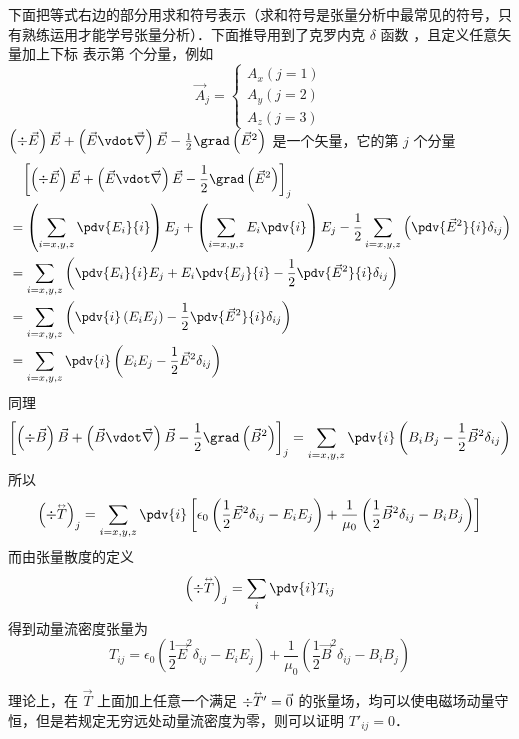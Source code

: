 下面把等式右边的部分用求和符号表示（求和符号是张量分析中最常见的符号，只有熟练运用才能学号张量分析）．下面推导用到了克罗内克 $\delta$ 函数 %
，且定义任意矢量加上下标 表示第 个分量，例如
\begin{equation}
{\vec A_j} = \left\{ \begin{array}{l}
{A_x} \left( {j = 1} \right)\\
{A_y}     \left( {j = 2} \right)\\
{A_z}      \left( {j = 3} \right)
\end{array} \right.
\end{equation} 
 $\left( {\div \vec E} \right)\vec E + \left( {\vec E\vdot\vec\nabla } \right)\vec E - \frac{1}{2}\grad \left( {{{\vec E}^2}} \right)$ 是一个矢量，它的第 $j$ 个分量
\begin{equation}
\begin{aligned}
&\phantom{={}} {\left[ {\left( {\div \vec E} \right)\vec E + \left( {\vec E\vdot\vec\nabla } \right)\vec E - \frac{1}{2}\grad \left( {{{\vec E}^2}} \right)} \right]_j}\\
&= \left( {\sum\limits_{i = x,y,z} {\pdv{E_i}{i}} } \right){E_j} + \left( {\sum\limits_{i = x,y,z} {{E_i}\pdv{i}} } \right){E_j} - \frac{1}{2}\sum\limits_{i = x,y,z} {\left( {\pdv{\vec E^2}{i} \delta_{ij}} \right)} \\
&= \sum\limits_{i = x,y,z} {\left( {\pdv{E_i}{i} E_j + {E_i} \pdv{E_j}{i} - \frac{1}{2} \pdv{\vec E^2}{i} \delta_{ij}} \right)} \\
&= \sum\limits_{i = x,y,z} {\left( {\pdv{i} \left( {{E_i}{E_j}} \right) - \frac{1}{2} \pdv{\vec E^2}{i}\delta_{ij}} \right)} \\
&= \sum\limits_{i = x,y,z} {\pdv{i} \left( {{E_i}{E_j} - \frac{1}{2}{{\vec E}^2}{\delta _{ij}}} \right)} 
\end{aligned}
\end{equation} 
同理
\begin{equation}
{\left[ {\left( {\div \vec B} \right)\vec B + \left( {\vec B\vdot\vec\nabla } \right)\vec B - \frac{1}{2}\grad \left( {{{\vec B}^2}} \right)} \right]_j} = \sum\limits_{i = x,y,z} {\pdv{i} \left( {{B_i}{B_j} - \frac{1}{2}{{\vec B}^2}{\delta _{ij}}} \right)} 
\end{equation} 
所以
\begin{equation}
{\left( {\div \mathord{\buildrel{\lower3pt\hbox{$\scriptscriptstyle\leftrightarrow$}} 
\over T} } \right)_j} = \sum\limits_{i = x,y,z} {\pdv{i} \left[ {{\epsilon_0}\left( {\frac{1}{2}{{\vec E}^2}{\delta _{ij}} - {E_i}{E_j}} \right) + \frac{1}{{{\mu _0}}}\left( {\frac{1}{2}{{\vec B}^2}{\delta _{ij}} - {B_i}{B_j}} \right)} \right]} 
\end{equation} 
而由张量散度的定义
\begin{equation}
{\left( {\div \mathord{\buildrel{\lower3pt\hbox{$\scriptscriptstyle\leftrightarrow$}} 
\over T} } \right)_j} = \sum\limits_i {\pdv{i} T_{ij}} 
\end{equation} 
得到动量流密度张量为
\begin{equation}
{T_{ij}} = {\epsilon_0}\left( {\frac{1}{2}{{\vec E}^2}{\delta _{ij}} - {E_i}{E_j}} \right) + \frac{1}{{{\mu _0}}}\left( {\frac{1}{2}{{\vec B}^2}{\delta _{ij}} - {B_i}{B_j}} \right)
\end{equation} 

理论上，在 $\vec T$ 上面加上任意一个满足 $\div \mathord{\buildrel{\lower3pt\hbox{$\scriptscriptstyle\leftrightarrow$}} 
\over T}{}'  = \vec 0$ 的张量场，均可以使电磁场动量守恒，但是若规定无穷远处动量流密度为零，则可以证明 ${T'_{ij}} = 0$． 
 
 
 